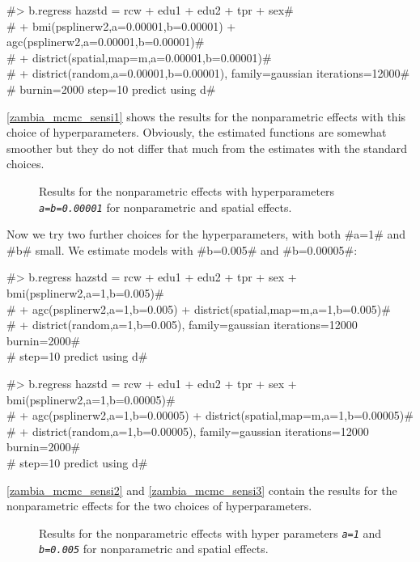 #> b.regress hazstd = rcw + edu1 + edu2 + tpr + sex#\\
#  + bmi(psplinerw2,a=0.00001,b=0.00001) + agc(psplinerw2,a=0.00001,b=0.00001)#\\
#  + district(spatial,map=m,a=0.00001,b=0.00001)#\\
#  + district(random,a=0.00001,b=0.00001), family=gaussian iterations=12000#\\
#  burnin=2000 step=10 predict using d#


\autoref{zambia_mcmc_sensi1} shows the results for the
nonparametric effects with this choice of hyperparameters.
Obviously, the estimated functions are somewhat smoother but they
do not differ that much from the estimates with the standard
choices.

\begin{figure}[ht]
\begin{center}
 {\it\caption{Results
for the nonparametric effects with hyperparameters {\em\tt a=b=0.00001}
for nonparametric and spatial effects.\label{zambia_mcmc_sensi1}}}
\end{center}
\end{figure}

Now we try two further choices for the hyperparameters, with both
#a=1# and #b# small. We estimate models with #b=0.005# and
#b=0.00005#:

#> b.regress hazstd = rcw + edu1 + edu2 + tpr + sex + bmi(psplinerw2,a=1,b=0.005)#\\
#  + agc(psplinerw2,a=1,b=0.005) + district(spatial,map=m,a=1,b=0.005)#\\
#  + district(random,a=1,b=0.005), family=gaussian iterations=12000 burnin=2000#\\
#  step=10 predict using d#

#> b.regress hazstd = rcw + edu1 + edu2 + tpr + sex + bmi(psplinerw2,a=1,b=0.00005)#\\
#  + agc(psplinerw2,a=1,b=0.00005) + district(spatial,map=m,a=1,b=0.00005)#\\
#  + district(random,a=1,b=0.00005), family=gaussian iterations=12000 burnin=2000#\\
#  step=10 predict using d#

\autoref{zambia_mcmc_sensi2} and \autoref{zambia_mcmc_sensi3}
contain the results for the nonparametric effects for the two
choices of hyperparameters.

\begin{figure}[ht]
\begin{center}
 {\it\caption{Results
for the nonparametric effects with hyper parameters {\em\tt a=1} and
{\em\tt b=0.005} for nonparametric and spatial
effects.\label{zambia_mcmc_sensi2}}}
\end{center}
\end{figure}

